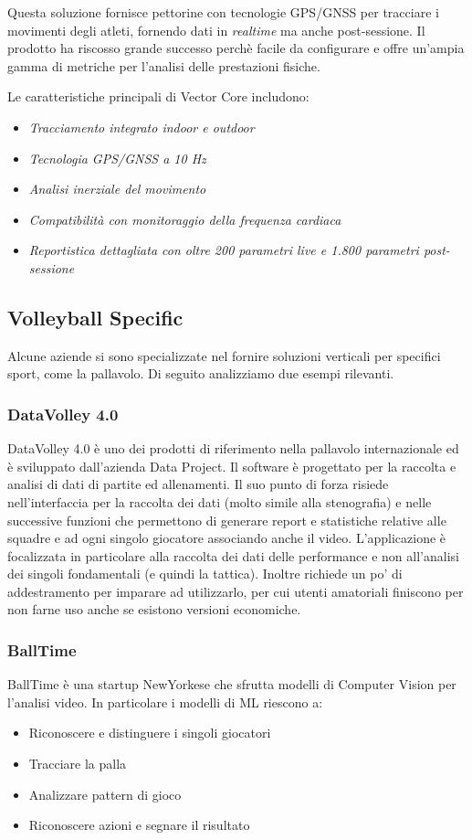 Questa soluzione fornisce pettorine con tecnologie GPS/GNSS  per tracciare i movimenti degli atleti, fornendo dati in \textit{realtime} ma anche post-sessione. Il prodotto ha riscosso grande successo perchè facile da configurare e offre un'ampia gamma di metriche per l'analisi delle prestazioni fisiche. 

\noindent Le caratteristiche principali di Vector Core includono:
\begin{itemize}
    \item \textit{Tracciamento integrato indoor e outdoor}
    \item \textit{Tecnologia GPS/GNSS a 10 Hz}
    \item \textit{Analisi inerziale del movimento}
    \item \textit{Compatibilità con monitoraggio della frequenza cardiaca}
    \item \textit{Reportistica dettagliata con oltre 200 parametri live e 1.800 parametri post-sessione}
\end{itemize}

\subsection{Volleyball Specific}
Alcune aziende si sono specializzate nel fornire soluzioni verticali per specifici sport, come la pallavolo. Di seguito analizziamo due esempi rilevanti.

\subsubsection{DataVolley 4.0}
DataVolley 4.0 \cite{Data-Volley4.0} è uno dei prodotti di riferimento nella pallavolo internazionale ed è sviluppato dall'azienda Data Project. Il software è progettato per la raccolta e analisi di dati di partite ed allenamenti. Il suo punto di forza risiede nell'interfaccia per la raccolta dei dati (molto simile alla stenografia) e nelle successive funzioni che permettono di generare report e statistiche relative alle squadre e ad ogni singolo giocatore associando anche il video. L'applicazione è focalizzata in particolare alla raccolta dei dati delle performance e non all'analisi dei singoli fondamentali (e quindi la tattica). Inoltre richiede un po' di addestramento per imparare ad utilizzarlo, per cui utenti amatoriali finiscono per non farne uso anche se esistono versioni economiche.


\subsubsection{BallTime}
BallTime \cite{BallTime} è una startup NewYorkese che sfrutta modelli di Computer Vision per l'analisi video. In particolare i modelli di ML riescono a:
\begin{itemize}
    \item Riconoscere e distinguere i singoli giocatori
    \item Tracciare la palla
    \item Analizzare pattern di gioco
    \item Riconoscere azioni e segnare il risultato
\end{itemize} 

